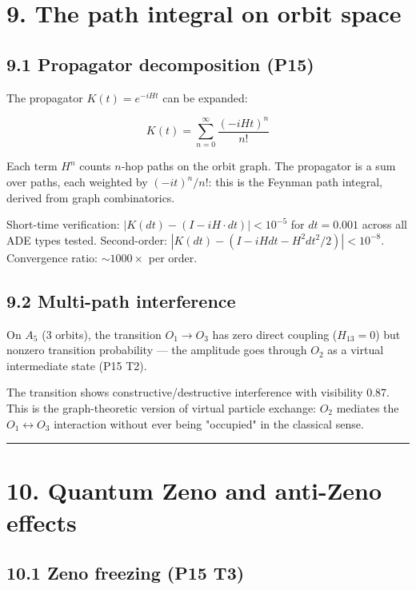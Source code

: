 \documentclass[11pt,a4paper]{article}
\begin{document}
\section*{9. The path integral on orbit space}

\subsection*{9.1 Propagator decomposition (P15)}

The propagator $K(t) = e^{-iHt}$ can be expanded:

\[K(t) = \sum_{n=0}^{\infty} \frac{(-iHt)^n}{n!}\]

Each term $H^n$ counts $n$-hop paths on the orbit graph. The propagator is a sum over paths, each weighted by $(-it)^n/n!$: this is the Feynman path integral, derived from graph combinatorics.

Short-time verification: $|K(dt) - (I - iH \cdot dt)| < 10^{-5}$ for $dt = 0.001$ across all ADE types tested. Second-order: $|K(dt) - (I - iHdt - H^2 dt^2/2)| < 10^{-8}$. Convergence ratio: $\sim 1000\times$ per order.

\subsection*{9.2 Multi-path interference}

On $A_5$ (3 orbits), the transition $O_1 \to O_3$ has zero direct coupling ($H_{13} = 0$) but nonzero transition probability — the amplitude goes through $O_2$ as a virtual intermediate state (P15 T2).

The transition shows constructive/destructive interference with visibility 0.87. This is the graph-theoretic version of virtual particle exchange: $O_2$ mediates the $O_1 \leftrightarrow O_3$ interaction without ever being "occupied" in the classical sense.

\begin{center}\rule{0.5\linewidth}{0.4pt}\end{center}

\section*{10. Quantum Zeno and anti-Zeno effects}

\subsection*{10.1 Zeno freezing (P15 T3)}
\end{document}
